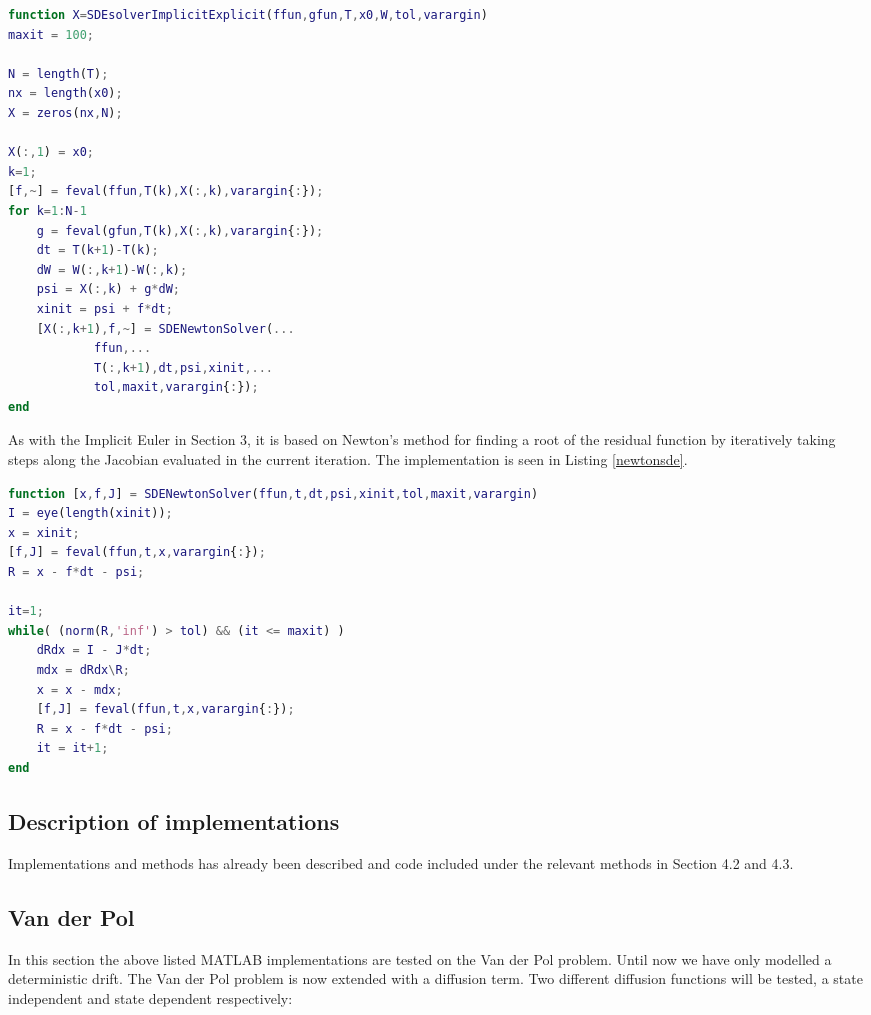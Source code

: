 \begin{adjustwidth*}{0cm}{-0.4cm}
\begin{lstlisting}[frame=single, language=Matlab,caption=Implicit-Explicit, label=implicitexplicit]
function X=SDEsolverImplicitExplicit(ffun,gfun,T,x0,W,tol,varargin)
maxit = 100;

N = length(T);
nx = length(x0);
X = zeros(nx,N);

X(:,1) = x0;
k=1;
[f,~] = feval(ffun,T(k),X(:,k),varargin{:});
for k=1:N-1
    g = feval(gfun,T(k),X(:,k),varargin{:});
    dt = T(k+1)-T(k);
    dW = W(:,k+1)-W(:,k);
    psi = X(:,k) + g*dW;
    xinit = psi + f*dt;
    [X(:,k+1),f,~] = SDENewtonSolver(...
            ffun,...
            T(:,k+1),dt,psi,xinit,...
            tol,maxit,varargin{:});
end
\end{lstlisting}
\end{adjustwidth*}

As with the Implicit Euler in Section 3, it is based on Newton's method for finding a root of the residual function by iteratively taking steps along the Jacobian evaluated in the current iteration. The implementation is seen in Listing \ref{newtonsde}.

\begin{adjustwidth*}{0cm}{-0.4cm}
\begin{lstlisting}[frame=single, language=Matlab,caption=Newton's Method for SDEs, label=newtonsde]
function [x,f,J] = SDENewtonSolver(ffun,t,dt,psi,xinit,tol,maxit,varargin)
I = eye(length(xinit));
x = xinit;
[f,J] = feval(ffun,t,x,varargin{:});
R = x - f*dt - psi;

it=1;
while( (norm(R,'inf') > tol) && (it <= maxit) )
    dRdx = I - J*dt;
    mdx = dRdx\R;
    x = x - mdx;
    [f,J] = feval(ffun,t,x,varargin{:});
    R = x - f*dt - psi;
    it = it+1;
end
\end{lstlisting}
\end{adjustwidth*}


\subsection{Description of implementations}
Implementations and methods has already been described and code included under the relevant methods in Section 4.2 and 4.3.

\subsection{Van der Pol}
In this section the above listed MATLAB implementations are tested on the Van der Pol problem. Until now we have only modelled a deterministic drift. The Van der Pol problem is now extended with a diffusion term. Two different diffusion functions will be tested, a state independent and state dependent respectively:

